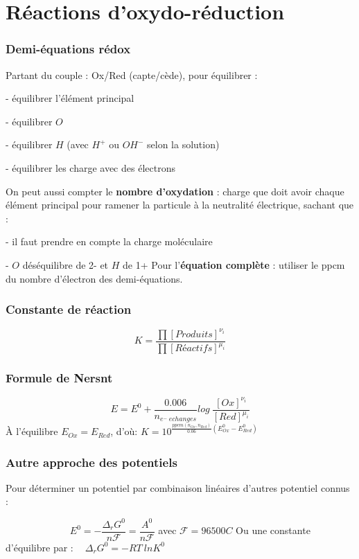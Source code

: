 \documentclass[9pt,twocolumn]{article}
\begin{document}
\setlength{\columnseprule}{0.1pt}
\part*{Réactions d'oxydo-réduction}
\section{Demi-équations rédox}
Partant du couple : Ox/Red (capte/cède), pour équilibrer :

 - équilibrer l'élément principal

 - équilibrer $O$

 - équilibrer $H$ (avec $H^+$ ou $OH^-$ selon la solution)

 - équilibrer les charge avec des électrons
 
 \bigbreak
 On peut aussi compter le \textbf{nombre d'oxydation} : charge que doit avoir chaque élément principal pour ramener la particule à la neutralité électrique, sachant que : 

 - il faut prendre en compte la charge moléculaire

 - $O$ déséquilibre de 2- et $H$ de 1+
 \bigbreak
 Pour l'\textbf{équation complète} : utiliser le ppcm du nombre d'électron des demi-équations.

\section{Constante de réaction}

$$\boxed{K=\dfrac{\prod [Produits]^{\nu_i}}{\prod [Réactifs]^{\mu_i}}}$$
\section{Formule de Nersnt}
$$\boxed{E=E^0+\dfrac{0.006}{n_{e^-\>echanges}}log\>\dfrac{[Ox]^{\nu_i}}{[Red]^{\mu_i}}}$$ 
À l'équilibre $E_{Ox}=E_{Red}$, d'où: $K=10^{\frac{ppcm(n_{Ox},n_{Red})}{0.06}(E^0_{Ox}-E^0_{Red})}$

\section{Autre approche des potentiels}

Pour déterminer un potentiel par combinaison linéaires d'autres potentiel connus :

$\>\>\>\>\>\>\>\>\>\>\>\>\>\>\>\>\>\>\>\>\>\>\>\>\>\>\>\>\>\>\boxed{E^0=-\dfrac{\Delta_rG^0}{n\mathcal{F}} = \dfrac{A^0}{n\mathcal{F}}}$ avec $\mathcal{F}=96500C$
\medbreak
Ou une constante d'équilibre par :
$\>\>\>\>\boxed{\Delta_rG^0=-RT\>lnK^0}$
\end{document}
